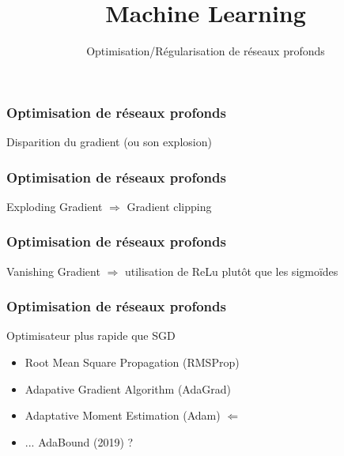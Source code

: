 \documentclass{formation}
\title{Machine Learning}
\subtitle{Optimisation/Régularisation de réseaux profonds}
\begin{document}
\maketitle

\begin{frame}
  \frametitle{Optimisation de réseaux profonds}
  Disparition du gradient (ou son explosion)
\end{frame}

\begin{frame}
  \frametitle{Optimisation de réseaux profonds}
  Exploding Gradient $\Rightarrow$ Gradient clipping
\end{frame}

\begin{frame}
  \frametitle{Optimisation de réseaux profonds}
  Vanishing Gradient $\Rightarrow$ utilisation de ReLu plutôt que les sigmoïdes
\end{frame}

\begin{frame}
  \frametitle{Optimisation de réseaux profonds}
  Optimisateur plus rapide que SGD
  \begin{itemize}
  \item Root Mean Square Propagation (RMSProp)
  \item Adapative Gradient Algorithm (AdaGrad)
  \item Adaptative Moment Estimation (Adam)    $\Leftarrow$
  \item ... AdaBound (2019) ?
 \end{itemize}
\end{frame}
\end{document}
